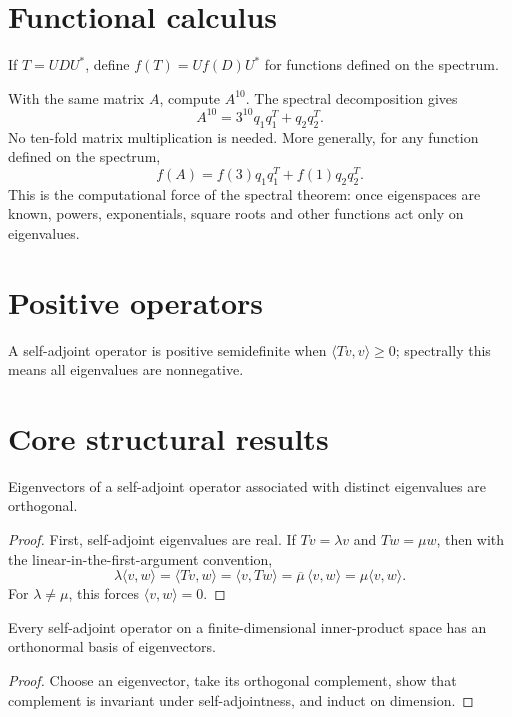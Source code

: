 \section{Functional calculus}
If $T=UDU^*$, define $f(T)=Uf(D)U^*$ for functions defined on the spectrum.


\begin{example}\label{ex:i16-expand-03}
With the same matrix \(A\), compute \(A^{10}\). The spectral decomposition gives
\[
A^{10}=3^{10}q_1q_1^T+q_2q_2^T.
\]
No ten-fold matrix multiplication is needed. More generally, for any function
defined on the spectrum,
\[
f(A)=f(3)q_1q_1^T+f(1)q_2q_2^T.
\]
This is the computational force of the spectral theorem: once eigenspaces are
known, powers, exponentials, square roots and other functions act only on
eigenvalues.
\end{example}
\section{Positive operators}
A self-adjoint operator is positive semidefinite when $\langle Tv,v\rangle\ge0$; spectrally this means all eigenvalues are nonnegative.

\section{Core structural results}

\begin{theorem}\label{thm:i16-01}
Eigenvectors of a self-adjoint operator associated with distinct eigenvalues are orthogonal.
\begin{proof}
First, self-adjoint eigenvalues are real. If \(Tv=\lambda v\) and
\(Tw=\mu w\), then with the linear-in-the-first-argument convention,
\[
\lambda\langle v,w\rangle
=\langle Tv,w\rangle
=\langle v,Tw\rangle
=\overline\mu\,\langle v,w\rangle
=\mu\langle v,w\rangle.
\]
For \(\lambda\ne\mu\), this forces \(\langle v,w\rangle=0\).
\end{proof}
\end{theorem}

\begin{theorem}\label{thm:i16-02}
Every self-adjoint operator on a finite-dimensional inner-product space has an orthonormal basis of eigenvectors.
\begin{proof}
Choose an eigenvector, take its orthogonal complement, show that complement is invariant under self-adjointness, and induct on dimension.
\end{proof}
\end{theorem}

